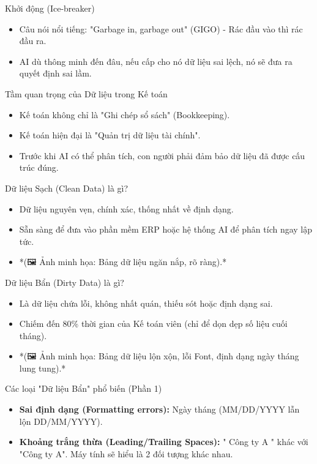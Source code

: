 \documentclass[aspectratio=169]{beamer}
\begin{document}
\begin{frame}{Khởi động (Ice-breaker)}
    \begin{itemize}
        \item Câu nói nổi tiếng: "Garbage in, garbage out" (GIGO) - Rác đầu vào thì rác đầu ra.
        \item AI dù thông minh đến đâu, nếu cấp cho nó dữ liệu sai lệch, nó sẽ đưa ra quyết định sai lầm.
    \end{itemize}
\end{frame}


\begin{frame}{Tầm quan trọng của Dữ liệu trong Kế toán}
    \begin{itemize}
        \item Kế toán không chỉ là "Ghi chép sổ sách" (Bookkeeping).
        \item Kế toán hiện đại là "Quản trị dữ liệu tài chính".
        \item Trước khi AI có thể phân tích, con người phải đảm bảo dữ liệu đã được cấu trúc đúng.
    \end{itemize}
\end{frame}


\begin{frame}{Dữ liệu Sạch (Clean Data) là gì?}
    \begin{itemize}
        \item Dữ liệu nguyên vẹn, chính xác, thống nhất về định dạng.
        \item Sẵn sàng để đưa vào phần mềm ERP hoặc hệ thống AI để phân tích ngay lập tức.
        \item *(🖼️ Ảnh minh họa: Bảng dữ liệu ngăn nắp, rõ ràng).*
    \end{itemize}
\end{frame}


\begin{frame}{Dữ liệu Bẩn (Dirty Data) là gì?}
    \begin{itemize}
        \item Là dữ liệu chứa lỗi, không nhất quán, thiếu sót hoặc định dạng sai.
        \item Chiếm đến 80\% thời gian của Kế toán viên (chỉ để dọn dẹp số liệu cuối tháng).
        \item *(🖼️ Ảnh minh họa: Bảng dữ liệu lộn xộn, lỗi Font, định dạng ngày tháng lung tung).*
    \end{itemize}
\end{frame}


\begin{frame}{Các loại "Dữ liệu Bẩn" phổ biến (Phần 1)}
    \begin{itemize}
        \item \textbf{Sai định dạng (Formatting errors):} Ngày tháng (MM/DD/YYYY lẫn lộn DD/MM/YYYY).
        \item \textbf{Khoảng trắng thừa (Leading/Trailing Spaces):} " Công ty A " khác với "Công ty A". Máy tính sẽ hiểu là 2 đối tượng khác nhau.
    \end{itemize}
\end{frame}
\end{document}
